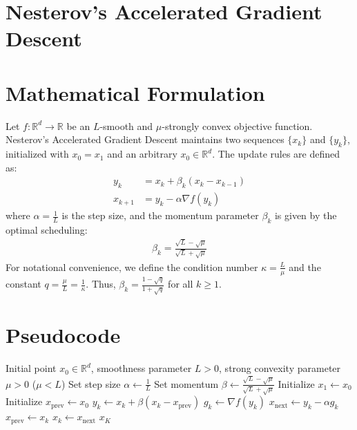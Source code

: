 \documentclass{article}
\begin{document}
\section*{Nesterov's Accelerated Gradient Descent}

\section*{Mathematical Formulation}
Let $f: \mathbb{R}^d \rightarrow \mathbb{R}$ be an $L$-smooth and $\mu$-strongly convex objective function. Nesterov's Accelerated Gradient Descent maintains two sequences $\{x_k\}$ and $\{y_k\}$, initialized with $x_0 = x_1$ and an arbitrary $x_0 \in \mathbb{R}^d$. The update rules are defined as:
\begin{align}
y_k &= x_k + \beta_k (x_k - x_{k-1}) \\
x_{k+1} &= y_k - \alpha \nabla f(y_k)
\end{align}
where $\alpha = \frac{1}{L}$ is the step size, and the momentum parameter $\beta_k$ is given by the optimal scheduling:
\begin{align}
\beta_k = \frac{\sqrt{L} - \sqrt{\mu}}{\sqrt{L} + \sqrt{\mu}}
\end{align}
For notational convenience, we define the condition number $\kappa = \frac{L}{\mu}$ and the constant $q = \frac{\mu}{L} = \frac{1}{\kappa}$. Thus, $\beta_k = \frac{1 - \sqrt{q}}{1 + \sqrt{q}}$ for all $k \ge 1$.

\section*{Pseudocode}
\begin{algorithm}[H]
\caption{Nesterov's Accelerated Gradient Descent}
\begin{algorithmic}[1]
\REQUIRE Initial point $x_0 \in \mathbb{R}^d$, smoothness parameter $L > 0$, strong convexity parameter $\mu > 0$ ($\mu < L$)
\STATE Set step size $\alpha \leftarrow \frac{1}{L}$
\STATE Set momentum $\beta \leftarrow \frac{\sqrt{L} - \sqrt{\mu}}{\sqrt{L} + \sqrt{\mu}}$
\STATE Initialize $x_1 \leftarrow x_0$
\STATE Initialize $x_{\text{prev}} \leftarrow x_0$
    \STATE $y_k \leftarrow x_k + \beta (x_k - x_{\text{prev}})$
    \STATE $g_k \leftarrow \nabla f(y_k)$
    \STATE $x_{\text{next}} \leftarrow y_k - \alpha g_k$
    \STATE $x_{\text{prev}} \leftarrow x_k$
    \STATE $x_k \leftarrow x_{\text{next}}$
\ENDFOR
\RETURN $x_K$
\end{algorithmic}
\end{algorithm}
\end{document}
